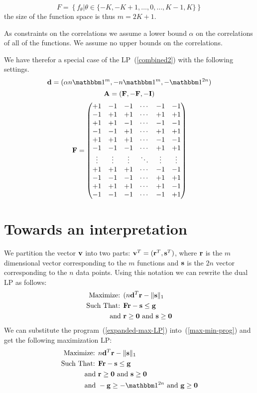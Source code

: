 \documentclass{article}[12pt]
\begin{document}
\[F=\left\{ f_{\theta} \left| 
          \theta \in \{-K,-K+1,\ldots,0,\ldots,K-1,K\}
         \right. \right\}
\]
the size of the function space is thus $m = 2K+1$.

As constraints on the correlations we assume a lower bound $\alpha$ on
the correlations of all of the functions. We assume no upper bounds on
the correlations.

We have therefor a special case of the LP~(\ref{combined2}) with the
following settings. 
\[
\vd = (\alpha n \ones{m}, - n \ones{m} , -\ones{2n}) 
\]
\[
\mathbf{A} = \left( \mathbf{F}, -\mathbf{F}, -\mathbf{I} \right) 
\]
\[
\mathbf{F}=
 \begin{pmatrix}
   +1 & -1 & -1 & \cdots & -1 & -1 \\
   -1 & +1 & +1 & \cdots & +1 & +1 \\
   +1 & +1 & -1 & \cdots & -1 & -1 \\
   -1 & -1 & +1 & \cdots & +1 & +1 \\
   +1 & +1 & +1 & \cdots & -1 & -1 \\
   -1 & -1 & -1 & \cdots & +1 & +1 \\
\vdots & \vdots & \vdots & \ddots & \vdots & \vdots \\
   +1 & +1 & +1 & \cdots & -1 & -1 \\
   -1 & -1 & -1 & \cdots & +1 & +1 \\
   +1 & +1 & +1 & \cdots & +1 & -1 \\
   -1 & -1 & -1 & \cdots & -1 & +1 
 \end{pmatrix}
\]


\section{Towards an interpretation}
We partition the vector $\mathbf{v}$ into two parts: $\mathbf{v}^T = (\mathbf{r}^T,\mathbf{s}^T)$,
where $\mathbf{r}$ is the $m$ dimensional vector corresponding to the $m$
functions and $\mathbf{s}$ is the $2n$ vector corresponding to the $n$ data
points.  Using this notation we can rewrite the dual LP as follows:
\begin{eqnarray}
\mbox{Maximize: }& (n \mathbf{d}^T \mathbf{r}  - \| \mathbf{s} \|_1 \label{expanded-max-LP}\\
\mbox{Such That: }& \mathbf{F} \mathbf{r}  - \mathbf{s} \leq \mathbf{g} \notag \\
\mbox{ and } & \mathbf{r} \geq \mathbf{0} \mbox{ and } \mathbf{s} \geq \mathbf{0} \notag
\end{eqnarray}
We can substitute the program~(\ref{expanded-max-LP})
into~(\ref{max-min-prog}) and get the following maximization LP:
\begin{eqnarray}
\mbox{Maximize: }& n \vd^T \vr  - \| \vs \|_1 \label{Combined-LP-1}\\
\mbox{Such That: }& \vF \vr  - \vs \leq \vg  \label{Combined-LP-2}\\
\mbox{ and } & \vr \geq \vzero \mbox{ and } \vs \geq \vzero \label{Combined-LP-3} \\
\mbox{ and } &  -\vg \geq -\ones{2n} \mbox{ and } \vg \geq \vzero \label{Combined-LP-4}
\end{eqnarray}
\end{document}

